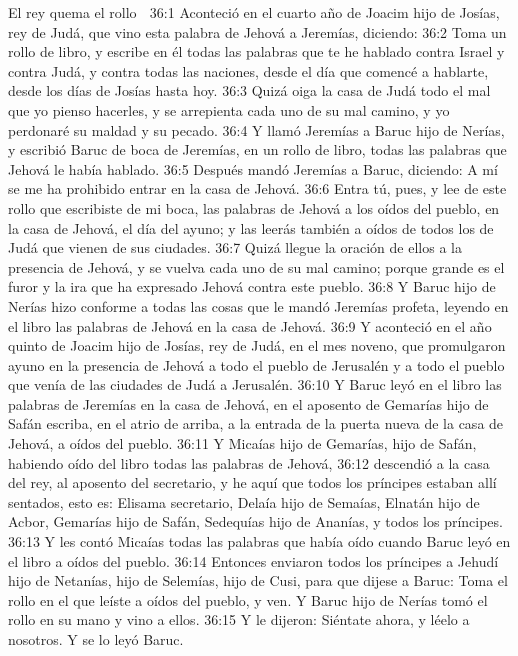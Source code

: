 El rey quema el rollo  

36:1 Aconteció en el cuarto año de Joacim hijo de Josías, rey de Judá, que vino esta palabra de Jehová a Jeremías, diciendo:  
36:2 Toma un rollo de libro, y escribe en él todas las palabras que te he hablado contra Israel y contra Judá, y contra todas las naciones, desde el día que comencé a hablarte, desde los días de Josías hasta hoy.  
36:3 Quizá oiga la casa de Judá todo el mal que yo pienso hacerles, y se arrepienta cada uno de su mal camino, y yo perdonaré su maldad y su pecado.  
36:4 Y llamó Jeremías a Baruc hijo de Nerías, y escribió Baruc de boca de Jeremías, en un rollo de libro, todas las palabras que Jehová le había hablado.  
36:5 Después mandó Jeremías a Baruc, diciendo: A mí se me ha prohibido entrar en la casa de Jehová.  
36:6 Entra tú, pues, y lee de este rollo que escribiste de mi boca, las palabras de Jehová a los oídos del pueblo, en la casa de Jehová, el día del ayuno; y las leerás también a oídos de todos los de Judá que vienen de sus ciudades.  
36:7 Quizá llegue la oración de ellos a la presencia de Jehová, y se vuelva cada uno de su mal camino; porque grande es el furor y la ira que ha expresado Jehová contra este pueblo.  
36:8 Y Baruc hijo de Nerías hizo conforme a todas las cosas que le mandó Jeremías profeta, leyendo en el libro las palabras de Jehová en la casa de Jehová.  
36:9 Y aconteció en el año quinto de Joacim hijo de Josías, rey de Judá, en el mes noveno, que promulgaron ayuno en la presencia de Jehová a todo el pueblo de Jerusalén y a todo el pueblo que venía de las ciudades de Judá a Jerusalén.  
36:10 Y Baruc leyó en el libro las palabras de Jeremías en la casa de Jehová, en el aposento de Gemarías hijo de Safán escriba, en el atrio de arriba, a la entrada de la puerta nueva de la casa de Jehová, a oídos del pueblo.  
36:11 Y Micaías hijo de Gemarías, hijo de Safán, habiendo oído del libro todas las palabras de Jehová,  
36:12 descendió a la casa del rey, al aposento del secretario, y he aquí que todos los príncipes estaban allí sentados, esto es: Elisama secretario, Delaía hijo de Semaías, Elnatán hijo de Acbor, Gemarías hijo de Safán, Sedequías hijo de Ananías, y todos los príncipes.  
36:13 Y les contó Micaías todas las palabras que había oído cuando Baruc leyó en el libro a oídos del pueblo.  
36:14 Entonces enviaron todos los príncipes a Jehudí hijo de Netanías, hijo de Selemías, hijo de Cusi, para que dijese a Baruc: Toma el rollo en el que leíste a oídos del pueblo, y ven. Y Baruc hijo de Nerías tomó el rollo en su mano y vino a ellos.  
36:15 Y le dijeron: Siéntate ahora, y léelo a nosotros. Y se lo leyó Baruc.  
